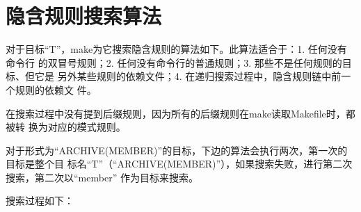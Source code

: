 \section{隐含规则搜索算法}
对于目标“T”，make为它搜索隐含规则的算法如下。此算法适合于：1. 任何没有命令行
的双冒号规则；2. 任何没有命令行的普通规则；3. 那些不是任何规则的目标、但它是
另外某些规则的依赖文件；4. 在递归搜索过程中，隐含规则链中前一个规则的依赖文
件。

在搜索过程中没有提到后缀规则，因为所有的后缀规则在make读取Makefile时，都被转
换为对应的模式规则。

对于形式为“ARCHIVE(MEMBER)”的目标，下边的算法会执行两次，第一次的目标是整个目
标名“T”（“ARCHIVE(MEMBER)”），如果搜索失败，进行第二次搜索，第二次以“member”
作为目标来搜索。

搜索过程如下：

